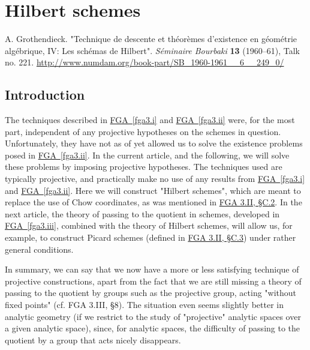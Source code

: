 \part{Hilbert schemes}\label{fga3.iv}\thispagestyle{fancy}\begin{original}{}\label{fga3.iv-original-citation}\skipsinglepar\par{}A. Grothendieck.
    "Technique de descente et théorèmes d'existence en géométrie algébrique, IV: Les schémas de Hilbert".
    \emph{Séminaire Bourbaki} \textbf{13} (1960–61), Talk no. 221.
    \url{http://www.numdam.org/book-part/SB_1960-1961__6__249_0/}\end{original}\chapter{Introduction}\thispagestyle{fancy}\label{fga3.iv-introduction}\par{}The techniques described in \hyperref[fga3.i]{FGA~\ref*{fga3.i}} and \hyperref[fga3.ii]{FGA~\ref*{fga3.ii}} were, for the most part, independent of any projective hypotheses on the schemes in question.
  Unfortunately, they have not as of yet allowed us to solve the existence problems posed in \hyperref[fga3.ii]{FGA~\ref*{fga3.ii}}.
  In the current article, and the following, we will solve these problems by imposing projective hypotheses.
  The techniques used are typically projective, and practically make no use of any results from \hyperref[fga3.i]{FGA~\ref*{fga3.i}} and \hyperref[fga3.ii]{FGA~\ref*{fga3.ii}}.
  Here we will construct "Hilbert schemes", which are meant to replace the use of Chow coordinates, as was mentioned in \hyperref[fga3.ii-c.2]{FGA 3.II, §C.2}.
  In the next article, the theory of passing to the quotient in schemes, developed in \hyperref[fga3.iii]{FGA~\ref*{fga3.iii}}, combined with the theory of Hilbert schemes, will allow us, for example, to construct Picard schemes (defined in \hyperref[fga3.ii-c.3]{FGA 3.II, §C.3}) under rather general conditions.\par{}In summary, we can say that we now have a more or less satisfying technique of projective constructions, apart from the fact that we are still missing a theory of passing to the quotient by groups such as the projective group, acting "without fixed points" (cf. FGA 3.III, §8).
  The situation even seems slightly better in analytic geometry (if we restrict to the study of "projective" analytic spaces over a given analytic space), since, for analytic spaces, the difficulty of passing to the quotient by a group that acts nicely disappears.
